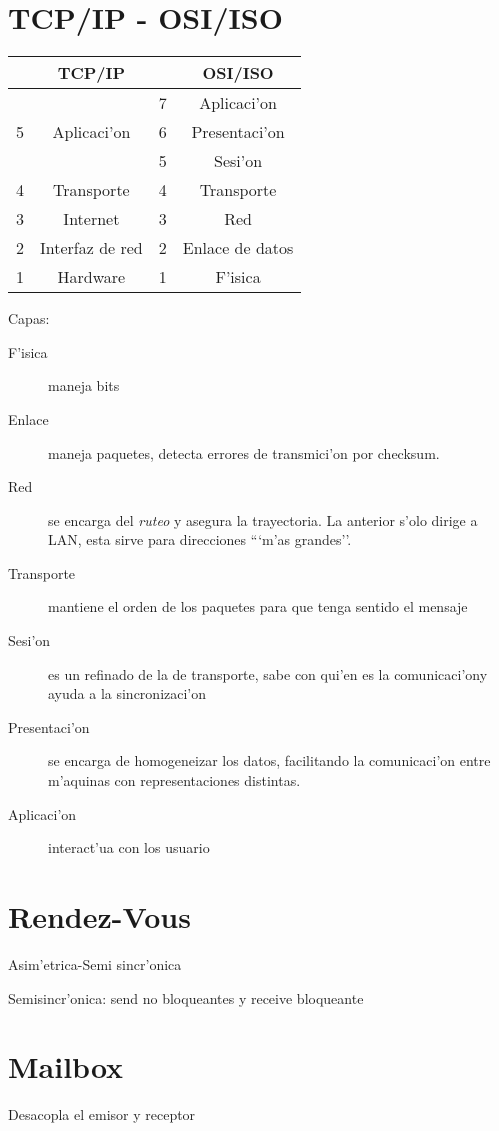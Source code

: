 \documentclass[a4paper,spanish]{article}
\begin{document}
\section{TCP/IP - OSI/ISO}
\begin{tabular}{|c|c|c|c|}
\hline
&TCP/IP & & OSI/ISO\\ \hline
 & 		& 7 & Aplicaci'on\\
5& Aplicaci'on 	& 6 & Presentaci'on\\
 & 	 	& 5 & Sesi'on\\
4& Transporte 	& 4 & Transporte\\
3& Internet	& 3 & Red\\
2& Interfaz de red &2& Enlace de datos\\
1& Hardware	& 1 & F'isica\\ \hline
\end{tabular}

Capas:
\begin{description}
	\item[F'isica] maneja bits
	\item[Enlace] maneja paquetes, detecta errores de transmici'on por checksum.
	\item[Red] se encarga del \emph{ruteo}  y asegura la trayectoria. La anterior s'olo dirige a LAN, esta sirve para direcciones ```m'as grandes''.
	\item[Transporte] mantiene el orden de los paquetes para que tenga sentido el mensaje
	\item[Sesi'on] es un refinado de la de transporte, sabe con qui'en es la comunicaci'ony ayuda a la sincronizaci'on
	\item[Presentaci'on] se encarga de homogeneizar los datos, facilitando la comunicaci'on entre m'aquinas con representaciones distintas.
	\item[Aplicaci'on] interact'ua con los usuario
\end{description}

\section{Rendez-Vous}
Asim'etrica-Semi sincr'onica

Semisincr'onica: send no bloqueantes y receive bloqueante

\section{Mailbox}
Desacopla el emisor y receptor
\end{document}
